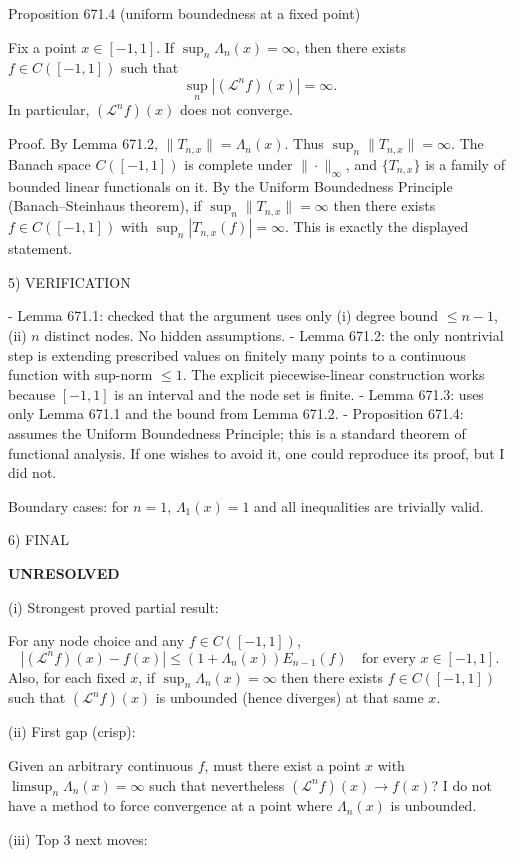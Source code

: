 Proposition 671.4 (uniform boundedness at a fixed point)

Fix a point $x\in[-1,1]$. If $\sup_n \Lambda_n(x)=\infty$, then there exists $f\in C([-1,1])$ such that
\[
 \sup_n |(\mathcal L^n f)(x)|=\infty.
\]
In particular, $(\mathcal L^n f)(x)$ does not converge.

Proof.
By Lemma 671.2, $\|T_{n,x}\|=\Lambda_n(x)$. Thus $\sup_n\|T_{n,x}\|=\infty$. The Banach space $C([-1,1])$ is complete under $\|\cdot\|_\infty$, and $\{T_{n,x}\}$ is a family of bounded linear functionals on it. By the Uniform Boundedness Principle (Banach--Steinhaus theorem), if $\sup_n\|T_{n,x}\|=\infty$ then there exists $f\in C([-1,1])$ with $\sup_n |T_{n,x}(f)|=\infty$. This is exactly the displayed statement.


5) VERIFICATION

- Lemma 671.1: checked that the argument uses only (i) degree bound $\le n-1$, (ii) $n$ distinct nodes. No hidden assumptions.
- Lemma 671.2: the only nontrivial step is extending prescribed values on finitely many points to a continuous function with sup-norm $\le 1$. The explicit piecewise-linear construction works because $[-1,1]$ is an interval and the node set is finite.
- Lemma 671.3: uses only Lemma 671.1 and the bound from Lemma 671.2.
- Proposition 671.4: assumes the Uniform Boundedness Principle; this is a standard theorem of functional analysis. If one wishes to avoid it, one could reproduce its proof, but I did not.

Boundary cases: for $n=1$, $\Lambda_1(x)=1$ and all inequalities are trivially valid.

6) FINAL

\textbf{UNRESOLVED}

(i) Strongest proved partial result:

For any node choice and any $f\in C([-1,1])$,
\[
 |(\mathcal L^n f)(x)-f(x)|\le (1+\Lambda_n(x))E_{n-1}(f)\quad\text{for every }x\in[-1,1].
\]
Also, for each fixed $x$, if $\sup_n\Lambda_n(x)=\infty$ then there exists $f\in C([-1,1])$ such that $(\mathcal L^n f)(x)$ is unbounded (hence diverges) at that same $x$.

(ii) First gap (crisp):

Given an arbitrary continuous $f$, must there exist a point $x$ with $\limsup_n\Lambda_n(x)=\infty$ such that nevertheless $(\mathcal L^n f)(x)\to f(x)$? I do not have a method to force convergence at a point where $\Lambda_n(x)$ is unbounded.

(iii) Top 3 next moves:

